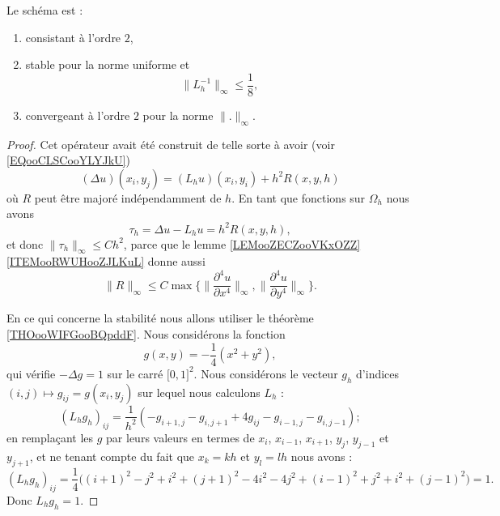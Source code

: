 \begin{proposition}
    Le schéma est :
    \begin{enumerate}
        \item
            consistant à l'ordre \( 2\),
        \item
            stable pour la norme uniforme et
            \begin{equation}
                \| L_h^{-1} \|_{\infty}\leq \frac{1}{ 8 },
            \end{equation}
        \item
            convergeant à l'ordre \( 2\) pour la norme \( \| . \|_{\infty}\).
    \end{enumerate}
\end{proposition}

\begin{proof}
    Cet opérateur avait été construit de telle sorte à avoir (voir \eqref{EQooCLSCooYLYJkU})
    \begin{equation}
        (\Delta u)(x_i,y_j)=(L_hu)(x_i,y_i)+h^2R(x,y,h)
    \end{equation}
    où \( R\) peut être majoré indépendamment de \( h\). En tant que fonctions sur \( \Omega_h\) nous avons
    \begin{equation}
        \tau_h=\Delta u-L_hu=h^2R(x,y,h),
    \end{equation}
    et donc \( \| \tau_h \|_{\infty}\leq Ch^2\), parce que le lemme \ref{LEMooZECZooVKxOZZ}\ref{ITEMooRWUHooZJLKuL} donne aussi
    \begin{equation}
        \| R \|_{\infty}\leq C\max\{ \| \frac{ \partial^4u }{ \partial x^4 } \|_{\infty},\| \frac{ \partial^4u }{ \partial y^4 } \|_{\infty} \}.
    \end{equation}

    En ce qui concerne la stabilité nous allons utiliser le théorème \ref{THOooWIFGooBQpddF}. Nous considérons la fonction
    \begin{equation}
        g(x,y)=-\frac{1}{ 4 }(x^2+y^2),
    \end{equation}
    qui vérifie \( -\Delta g=1\) sur le carré \( \mathopen[ 0 , 1 \mathclose]^2\). Nous considérons le vecteur \( g_h\) d'indices \( (i,j)\mapsto g_{ij}=g(x_i,y_j)\) sur lequel nous calculons \( L_h\) :
    \begin{equation}
        (L_hg_h)_{ij}=\frac{1}{ h^2 }(-g_{i+1,j}-g_{i,j+1}+4g_{ij}-g_{i-1,j}-g_{i,j-1});
    \end{equation}
    en remplaçant les \( g\) par leurs valeurs en termes de \( x_i\), \( x_{i-1}\), \( x_{i+1}\), \( y_j\), \( y_{j-1}\) et \( y_{j+1}\), et ne tenant compte du fait que \( x_k=kh\) et \( y_l=lh\) nous avons :
    \begin{equation}
        (L_hg_h)_{ij}=\frac{1}{ 4 }\big( (i+1)^2-j^2+i^2+(j+1)^2-4i^2-4j^2+(i-1)^2+j^2+i^2+(j-1)^2 \big)=1.
    \end{equation}
    Donc \( L_hg_h=1\).


\end{proof}
